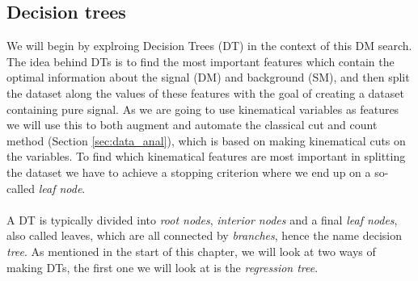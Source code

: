 \documentclass[12pt, a4paper]{book}
\begin{document}
\subsection{Decision trees}
We will begin by explroing Decision Trees (DT) in the context of this DM search. The idea behind DTs is to find the most important features which contain the optimal information about the signal (DM) and background (SM), and then split the dataset along the values of these features with the goal of creating a dataset containing pure signal. 
As we are going to use kinematical variables as features we will use this to both augment and automate the classical cut and count method (Section \ref{sec:data_anal}), which is based on making kinematical cuts on the variables. To find which kinematical features are most important 
in splitting the dataset we have to achieve a stopping criterion where we end up on a so-called \textit{leaf node}.\\
\\A DT is typically divided into \textit{root nodes}, \textit{interior nodes} and a final \textit{leaf nodes}, also called leaves, which are all connected by \textit{branches}, hence the name decision \textit{tree}. As mentioned in the start of this chapter, we will look at two ways of making DTs, 
the first one we will look at is the \textit{regression tree}. 
\end{document}
